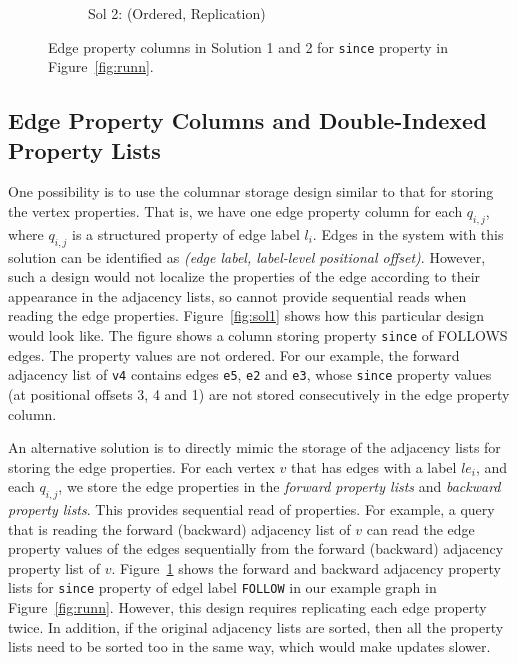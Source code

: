 \begin{figure}
\begin{subfigure}{0.55\textwidth}
		\captionsetup{justification=centering}
		\caption{Sol 2: (Ordered, Replication)}
		\label{fig:sol2}
	\end{subfigure}
	\captionsetup{justification=centering}
	\caption{Edge property columns in Solution 1 and 2 for \texttt{since} property in Figure~\ref{fig:runn}. }
	\label{fig:sol1and2}
\end{figure}

\subsection{Edge Property Columns and Double-Indexed Property Lists}

 One possibility is to use the columnar storage design similar to that for storing the vertex properties. That is, we have one edge property column for each $q_{i,j}$, where $q_{i,j}$ is a structured property of edge label $l_i$. Edges in the system with this solution can be identified as \emph{(edge label, label-level positional offset)}. However, such a design would not localize the properties of the edge according to their appearance in the adjacency lists, so cannot provide sequential reads when reading the edge properties. Figure~\ref{fig:sol1} shows how this particular design would look like. The figure shows a column storing property \texttt{since} of FOLLOWS edges. The property values are not ordered. For our example, the forward adjacency list of \texttt{v4} contains edges \texttt{e5}, \texttt{e2} and \texttt{e3}, whose \texttt{since} property values (at positional offsets 3, 4 and 1) are not stored consecutively in the edge property column. 

 An alternative solution is to directly mimic the storage of the adjacency lists for storing the edge properties. For each vertex $v$ that has edges with a label $le_i$, and each $q_{i,j}$, we store the edge properties in the \emph{forward property lists} and \emph{backward property lists}. This provides sequential read of properties. For example, a query that is reading the forward (backward) adjacency list of $v$ can read the edge property values of the edges sequentially from the forward (backward) adjacency property list of $v$. Figure~\ref{fig:sol2} shows the forward and backward adjacency property lists for \texttt{since} property of edgel label \texttt{FOLLOW} in our example graph in Figure~\ref{fig:runn}. However, this design requires replicating each edge property twice. In addition, if the original adjacency lists are sorted, then all the property lists need to be sorted too in the same way, which would make updates slower. 

